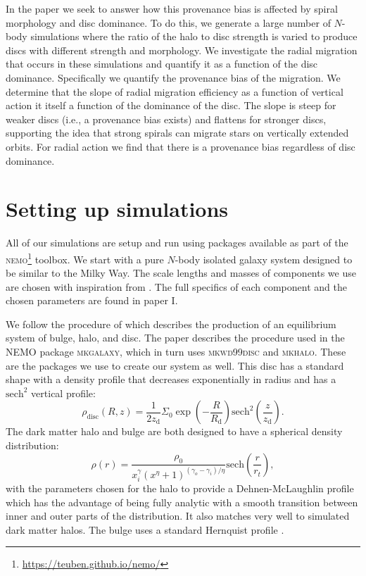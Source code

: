 In the paper we seek to answer how this provenance bias is affected by spiral morphology and disc dominance. To do this, we generate a large number of $N$-body simulations where the ratio of the halo to disc strength is varied to produce discs with different strength and morphology. We investigate the radial migration that occurs in these simulations and quantify it as a function of the disc dominance. Specifically we quantify the provenance bias of the migration. We determine that the slope of radial migration efficiency as a function of vertical action it itself a function of the dominance of the disc. The slope is steep for weaker discs (i.e., a provenance bias exists) and flattens for stronger discs, supporting the idea that strong spirals can migrate stars on vertically extended orbits. For radial action we find that there is a provenance bias regardless of disc dominance. 

\section{Setting up simulations}\label{sec:p1-simulations}
All of our simulations are setup and run using packages available as part of the \textsc{nemo}\footnote{\url{https://teuben.github.io/nemo/}}\citep{teuben:95} toolbox. We start with a pure $N$-body isolated galaxy system designed to be similar to the Milky Way. The scale lengths and masses of components we use are chosen with inspiration from \cite{mcmillan:17}. The full specifics of each component and the chosen parameters are found in paper I.

We follow the procedure of \cite{mcmillan:07} which describes the production of an equilibrium system of bulge, halo, and disc. The paper describes the procedure used in the \textsc{NEMO} package \textsc{mkgalaxy}, which in turn uses \textsc{mkwd99disc} and \textsc{mkhalo}. These are the packages we use to create our system as well. This disc has a standard shape with a density profile that decreases exponentially in radius and has a $\mathrm{sech}^2$ vertical profile:
\begin{equation}
    \rho_\mathrm{disc}(R, z) = \frac{1}{2z_\mathrm{d}} \Sigma_0 \exp\left(-\frac{R}{R_\mathrm{d}}\right) \mathrm{sech}^2\left(\frac{z}{z_\mathrm{d}}\right).
\end{equation}
The dark matter halo and bulge are both designed to have a spherical density distribution:
\begin{equation}
    \rho(r) = \frac{\rho_0}{x^\gamma_i(x^\eta + 1)^{(\gamma_o - \gamma_i)/\eta}} \mathrm{sech}\left(\frac{r}{r_t}\right),
\end{equation}
with the parameters chosen for the halo to provide a Dehnen-McLaughlin profile \citep{dehnen:05} which has the advantage of being fully analytic with a smooth transition between inner and outer parts of the distribution. It also matches very well to simulated dark matter halos. The bulge uses a standard Hernquist profile \citep{hernquist:90}.

